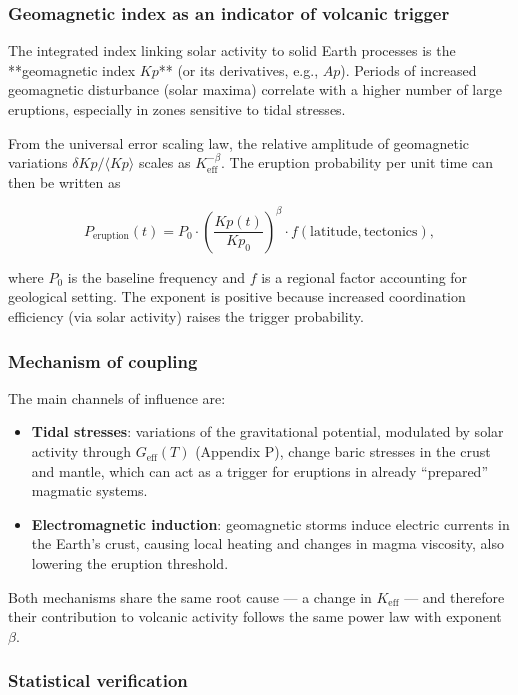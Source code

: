 \documentclass[12pt,a4paper]{article}
\newcommand{\Keff}{K_{\mathrm{eff}}}
\begin{document}
	\subsubsection{Geomagnetic index as an indicator of volcanic trigger}
	
	The integrated index linking solar activity to solid Earth processes is the **geomagnetic index \(Kp\)** (or its derivatives, e.g., \(Ap\)). Periods of increased geomagnetic disturbance (solar maxima) correlate with a higher number of large eruptions, especially in zones sensitive to tidal stresses.
	
	From the universal error scaling law, the relative amplitude of geomagnetic variations \(\delta Kp / \langle Kp \rangle\) scales as \(\Keff^{-\beta}\). The eruption probability per unit time can then be written as
	
	\[
	P_{\text{eruption}}(t) = P_0 \cdot \left( \frac{Kp(t)}{Kp_0} \right)^{\beta} \cdot f(\text{latitude}, \text{tectonics}),
	\]
	
	where \(P_0\) is the baseline frequency and \(f\) is a regional factor accounting for geological setting. The exponent is positive because increased coordination efficiency (via solar activity) raises the trigger probability.
	
	\subsubsection{Mechanism of coupling}
	
	The main channels of influence are:
	\begin{itemize}
		\item \textbf{Tidal stresses}: variations of the gravitational potential, modulated by solar activity through \(G_{\text{eff}}(T)\) (Appendix P), change baric stresses in the crust and mantle, which can act as a trigger for eruptions in already ``prepared'' magmatic systems.
		\item \textbf{Electromagnetic induction}: geomagnetic storms induce electric currents in the Earth's crust, causing local heating and changes in magma viscosity, also lowering the eruption threshold.
	\end{itemize}
	Both mechanisms share the same root cause — a change in \(\Keff\) — and therefore their contribution to volcanic activity follows the same power law with exponent \(\beta\).
	
	\subsubsection{Statistical verification}
	
\end{document}

